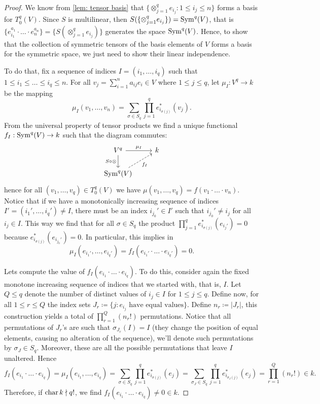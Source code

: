 \begin{proof}
We know from \cref{lem: tensor basis} that \(\{\otimes_{j=1}^q e_{i_j} \colon 1 \leq
i_j \leq n\}\) forms a basis for \(T_0^q(V)\). Since \(S\) is multilinear,
then \(S(\{\otimes_{j=1}^q e_{i_j}\}) = \operatorname{Sym}^q(V)\), that is \(\{e_{i_1}^{a_1}
\cdot \ldots \cdot e_n^{a_n}\} = \{S(\otimes_{j=1}^q e_{i_j})\}\) generates
the space \(\operatorname{Sym}^q(V)\). Hence, to show that the collection of symmetric
tensors of the basis elements of \(V\) forms a basis for the symmetric space,
we just need to show their linear independence.

To do that, fix a sequence of indices \(I = (i_1, \dots, i_q)\) such that  \(1
\leq i_1 \leq \dots \leq i_q \leq n\). For all \(v_j = \sum_{i=1}^n a_{ij} e_i
\in V\) where \(1 \leq j \leq q\), let \(\mu_I: V^q \to k\) be the mapping
\[
  \mu_I(v_1, \dots, v_n) = \sum_{\sigma \in S_q} \prod_{j=1}^q
  e_{i_{\sigma(j)}}^*(v_j).
\]
From the universal property of tensor products we find a unique
functional \(f_I: \operatorname{Sym}^q(V) \to k\) such that the diagram commutes:
\[
  \begin{tikzcd}
    V^q \ar[r, "\mu_I"] \ar[d, swap, "S \circ \otimes"] &k \\
    \Sym^q(V) \ar[ru, swap, dashed, "f_I"]
  \end{tikzcd}
\]
hence for all \((v_1, \dots, v_q) \in T_0^q(V)\) we have \(\mu(v_1, \dots,
v_q) = f(v_1 \cdot \ldots \cdot v_n)\). Notice that if we have a monotonically
increasing sequence of indices \(I' = (i_1', \dots, i_q') \neq I\), there must
be an index \(i_{j_0}' \in I'\) such that \(i_{j_0}' \neq i_j\) for all \(i_j
\in I\). This way we find that for all \(\sigma \in S_q\) the product
\(\prod_{j=1}^q e_{i_{\sigma(j)}}^*(e_{i_j'}) = 0\) because
\(e_{i_{\sigma(j)}}^*(e_{i_{j_0}'}) = 0\). In particular, this implies in
\[
  \mu_I(e_{i_1'}, \dots, e_{i_q'}) = f_I(e_{i_1'} \cdot \ldots \cdot e_{i_q'})
  = 0.
\]

Lets compute the value of \(f_I(e_{i_1} \cdot \ldots \cdot e_{i_q})\). To do
this, consider again the fixed monotone increasing sequence of indices that we
started with, that is, \(I\). Let \(Q \leq q\) denote the number of distinct
values of \(i_j \in I\) for \(1 \leq j \leq q\). Define now, for all \(1 \leq
r \leq Q\) the index sets \(J_r \coloneq \{j \colon e_{i_j} \text{ have equal
values}\}\). Define \(n_r \coloneq |J_r|\), this construction yields a total of
\(\prod_{r=1}^Q (n_r!)\) permutations. Notice that all permutations of
\(J_r\)'s are such that \(\sigma_{J_r}(I) = I\) (they change the position of
equal elements, causing no alteration of the sequence), we'll denote such
permutations by \(\sigma_J \in S_q\). Moreover, these are
all the possible permutations that leave \(I\) unaltered. Hence
\[
  f_I(e_{i_1} \cdot \ldots \cdot e_{i_q}) = \mu_I(e_{i_1}, \dots, e_{i_q})
  = \sum_{\sigma \in S_q} \prod_{j=1}^q e_{i_{\sigma(j)}}^*(e_j)
  = \sum_{\sigma_J \in S_q} \prod_{j=1}^q e_{i_{\sigma_J(j)}}^*(e_j)
  = \prod_{r=1}^Q (n_r!) \in k.
\]
Therefore, if \(\operatorname{char} k \nmid q!\), we find \(f_I(e_{i_1} \cdot \ldots \cdot
e_{i_q}) \neq 0 \in k\).


\end{proof}
